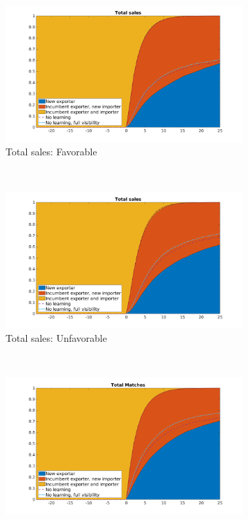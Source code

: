 \documentclass[12pt]{article}
\begin{document}
\begin{figure}[tbp]
\centering
\begin{subfigure}[b]{0.45\textwidth}
        \centering
        \includegraphics[width=\textwidth]{figures/total_sales_pct_comb}
        \caption{Total sales: Favorable}
    \end{subfigure} ~ 
\begin{subfigure}[b]{0.45\textwidth}
        \centering
        \includegraphics[width=\textwidth]{figures/total_sales_pct_unf_comb}
        \caption{Total sales: Unfavorable}
    \end{subfigure} \newline
~ 
\begin{subfigure}[b]{0.45\textwidth}
        \centering
        \includegraphics[width=\textwidth]{figures/total_matches_pct_comb}

\end{subfigure}
\end{figure}
\end{document}
